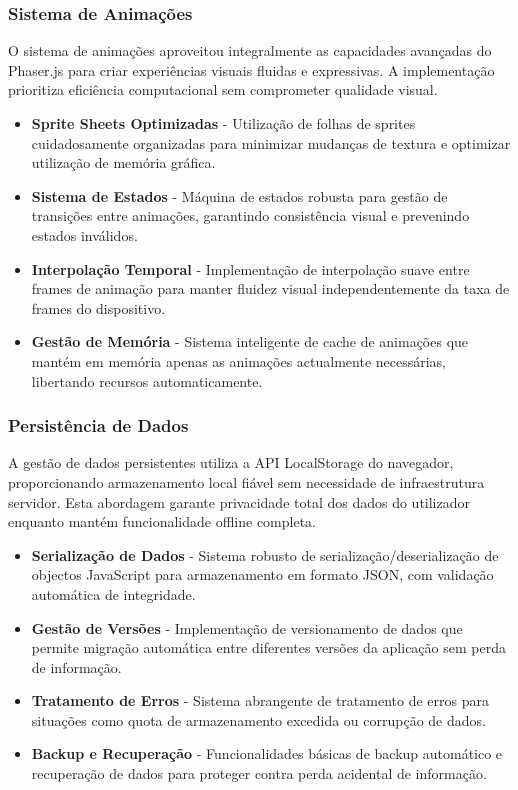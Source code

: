 \subsubsection{Sistema de Animações}
\hspace{2em} O sistema de animações aproveitou integralmente as capacidades avançadas do Phaser.js para criar experiências visuais fluidas e expressivas. A implementação prioritiza eficiência computacional sem comprometer qualidade visual.

\begin{itemize}
  \item \textbf{Sprite Sheets Optimizadas} - Utilização de folhas de sprites cuidadosamente organizadas para minimizar mudanças de textura e optimizar utilização de memória gráfica.
  
  \item \textbf{Sistema de Estados} - Máquina de estados robusta para gestão de transições entre animações, garantindo consistência visual e prevenindo estados inválidos.
  
  \item \textbf{Interpolação Temporal} - Implementação de interpolação suave entre frames de animação para manter fluidez visual independentemente da taxa de frames do dispositivo.
  
  \item \textbf{Gestão de Memória} - Sistema inteligente de cache de animações que mantém em memória apenas as animações actualmente necessárias, libertando recursos automaticamente.
\end{itemize}

\subsubsection{Persistência de Dados}
\hspace{2em} A gestão de dados persistentes utiliza a API LocalStorage do navegador, proporcionando armazenamento local fiável sem necessidade de infraestrutura servidor. Esta abordagem garante privacidade total dos dados do utilizador enquanto mantém funcionalidade offline completa.

\begin{itemize}
  \item \textbf{Serialização de Dados} - Sistema robusto de serialização/deserialização de objectos JavaScript para armazenamento em formato JSON, com validação automática de integridade.
  
  \item \textbf{Gestão de Versões} - Implementação de versionamento de dados que permite migração automática entre diferentes versões da aplicação sem perda de informação.
  
  \item \textbf{Tratamento de Erros} - Sistema abrangente de tratamento de erros para situações como quota de armazenamento excedida ou corrupção de dados.
  
  \item \textbf{Backup e Recuperação} - Funcionalidades básicas de backup automático e recuperação de dados para proteger contra perda acidental de informação.
\end{itemize}

